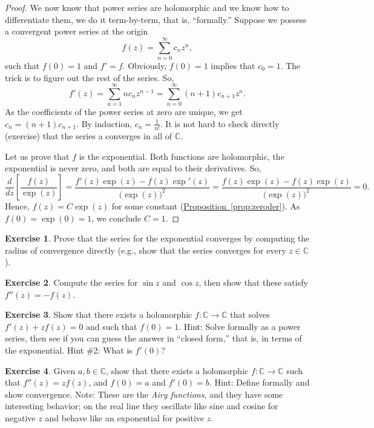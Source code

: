\documentclass[12pt,openany]{book}
\newcommand{\C}{{\mathbb{C}}}
\newcommand{\myindex}[1]{#1\index{#1}}
\newcommand{\myquote}[1]{``#1''}
\theoremstyle{plain}
\theoremstyle{remark}
\theoremstyle{definition}
\newenvironment{exbox}{%
    \def\FrameCommand{\vrule width 1pt \relax\hspace{10pt}}%
    \MakeFramed{\advance\hsize-\width\FrameRestore}%
}{%
    \endMakeFramed
}
\theoremstyle{exercise}
\newtheorem{exercise}{Exercise}[section]
\theoremstyle{example}
\newcommand{\propref}[1]{\hyperref[#1]{Proposition~\ref*{#1}}}
\begin{document}
\begin{proof}
We now know that power series are holomorphic and we know how
to differentiate them, we do it term-by-term, that is, \myquote{formally.}
Suppose we possess a convergent power series at the origin
\begin{equation*}
f(z) = \sum_{n=0}^\infty c_n z^n ,
\end{equation*}
such that $f(0)=1$ and $f'=f$.
Obviously, $f(0)=1$ implies that $c_0 = 1$.
The trick is to figure out the rest of the series.
So,
\begin{equation*}
f'(z) =
\sum_{n=1}^\infty n c_n z^{n-1} =
\sum_{n=0}^\infty (n+1) c_{n+1} z^{n} .
\end{equation*}
As the coefficients of the power series at zero are unique, we get
$c_n = (n+1) c_{n+1}$.  By induction, $c_n = \frac{1}{n!}$.
It is not hard to check directly (exercise)
that the series a converges in all of $\C$.

Let us prove that $f$ is the exponential.  Both functions are
holomorphic, the exponential is never zero, and both are equal to their
derivatives.  So,
\begin{equation*}
\frac{d}{dz} \left[ \frac{f(z)}{\exp(z)} \right]
=
\frac{f'(z)\exp(z) - f(z) \exp'(z)}{{\bigl(\exp(z)\bigr)}^2}
=
\frac{f(z)\exp(z) - f(z) \exp(z)}{{\bigl(\exp(z)\bigr)}^2}
= 0.
\end{equation*}
Hence, $f(z) = C \exp(z)$ for some constant (\propref{prop:zeroder}).
As $f(0) = \exp(0) = 1$,
we conclude $C=1$.
\end{proof}

\begin{exbox}
\begin{exercise}
Prove that the series for the exponential converges by computing
the radius of convergence directly
(e.g., show that the series converges for every $z \in \C$).
\end{exercise}

\begin{exercise}
Compute the series for $\sin z$ and $\cos z$, then show that these satisfy
$f''(z) = -f(z)$.
\end{exercise}

\begin{exercise}
Show that there exists a holomorphic $f \colon \C \to \C$ that
solves $f'(z) + z f(z) = 0$ and such that $f(0) = 1$.  Hint: Solve formally
as a power series,
then see if you can guess the answer in \myquote{closed form,} that is, in terms
of the exponential.  Hint \#2: What is $f'(0)$?
\end{exercise}

\begin{exercise}
Given $a,b \in \C$, show that there exists a holomorphic $f \colon \C \to
\C$ such that $f''(z) = z f(z)$, and $f(0) = a$ and $f'(0) = b$.
Hint: Define formally and show convergence.
Note: These are the \emph{\myindex{Airy functions}}, and they have some
interesting behavior; on the real line they oscillate like sine and cosine
for negative $z$ and behave like an exponential for positive $z$.
\end{exercise}
\end{exbox}
\end{document}
